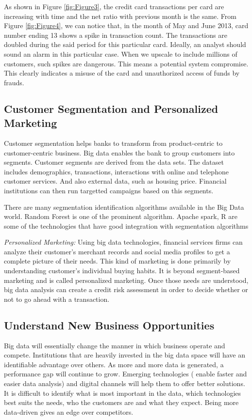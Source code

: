 \documentclass[sigconf]{acmart}
\begin{document}
As shown in Figure \ref{fig:Figure3}, the credit card transactions per card are increasing with time and the net ratio with previous month is the same.
From Figure \ref{fig:Figure4}, we can notice that, in the month of May and June 2013, card number ending 13 shows a spike in transaction count. The transactions are doubled during the said period for this particular card. Ideally, an analyst should sound an alarm in this particular case. When we upscale to include millions of customers, such spikes are dangerous. This means a potential system compromise. This clearly indicates a misuse of the card and unauthorized access of funds by frauds.



\subsection{Customer Segmentation and Personalized Marketing}

Customer segmentation helps banks to transform from product-centric to customer-centric business. Big data enables the bank to group customers into segments. Customer segments are derived from the data sets. The dataset includes demographics, transactions, interactions with online and telephone customer services. And also external data, such as housing price. Financial institutions can then run targetted campaigns based on this segments\cite{5-big-data-use-cases-in-banking-and-financial-services}.

There are many segmentation identification algorithms available in the Big Data world.  Random Forest is one of the prominent algorithm. Apache spark, R are some of the technologies that have good integration with segmentation algorithms

\textit{Personalized Marketing:} Using big data technologies, financial services firms can analyze their customer's merchant records and social media profiles to get a complete picture of their needs.  This kind of marketing is done primarily by understanding customer's individual buying habits. It is beyond segment-based marketing and is called personalized marketing. Once those needs are understood, big data analysis can create a credit risk assessment in order to decide whether or not to go ahead with a transaction\cite{5-big-data-use-cases-in-banking-and-financial-services}.

    
\subsection{Understand New Business Opportunities}
Big data will essentially change the manner in which business operate and compete. Institutions that are heavily invested in the big data space will have an identifiable advantage over others. As more and more data is generated, a performance gap will continue to grow. Emerging technologies ( enable faster and easier data analysis) and digital channels will help them to offer better solutions. It is difficult to identify what is most important in the data, which technologies best suits the needs, who the customers are and what they expect. Being more data-driven gives an edge over competitors\cite{bigdata-ey}.
\end{document}
